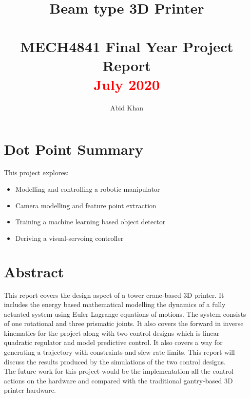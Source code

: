 \documentclass{UoNMCHA}
\numberwithin{equation}{section}
\begin{document}
\title{Beam type 3D Printer \\ \ \\
{\small MECH4841 Final Year Project Report  \\\textcolor{red}{July 2020}}}
\author[UoNMCHA]{Abid Khan}
\address[UoNMCHA]{
Student of Mechatronics Engineering,\\
The University of Newcastle, Callaghan, NSW 2308, AUSTRALIA \\
Student Number: \textcolor{red}{c325555} \\
E-mail: \href{mailto:Abid.Khan@uon.edu.au}{\textsf{Muhammad.H.Khan@uon.edu.au}}}
\maketitle
\onecolumn

\vspace{-5mm}
\section*{Dot Point Summary}

This project explores:
\begin{itemize}
	\color{red}
	\item Modelling and controlling a robotic manipulator
	\item Camera modelling and feature point extraction
	\item Training a machine learning based object detector
	\item Deriving a visual-servoing controller 


\end{itemize}

\newpage
\vspace{-5mm}
\section*{Abstract}

This report covers the design aspect of a tower crane-based 3D printer. It includes the energy based mathematical modelling the dynamics of a fully actuated system using Euler-Lagrange equations of motions. The system consists of one rotational and three prismatic joints. It also covers the forward in inverse kinematics for the project along with two control designs which is linear quadratic regulator and model predictive control. It also covers a way for generating a trajectory with constraints and slew rate limits. This report will discuss the results produced by the simulations of the two control designs. \\
The future work for this project would be the implementation all the control actions on the hardware and compared with the traditional gantry-based 3D printer hardware.
\end{document}
